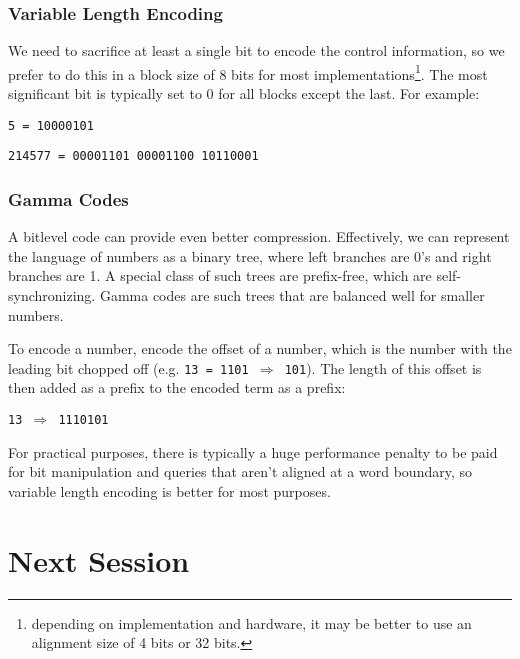 \documentclass{idc_msc}
\begin{document}
\subsubsection{Variable Length Encoding}

We need to sacrifice at least a single bit to encode the control information, so we prefer to do this in a block size of 8 bits for most implementations\footnote{depending on implementation and hardware, it may be better to use an alignment size of 4 bits or 32 bits.}.
The most significant bit is typically set to 0 for all blocks except the last.
For example:

\begin{center}
\texttt{5 = 10000101}

\texttt{214577 = 00001101 00001100 10110001}
\end{center}

\subsubsection{Gamma Codes}

A bitlevel code can provide even better compression.
Effectively, we can represent the language of numbers as a binary tree, where left branches are 0's and right branches are 1.
A special class of such trees are prefix-free, which are self-synchronizing.
Gamma codes are such trees that are balanced well for smaller numbers.

To encode a number, encode the offset of a number, which is the number with the leading bit chopped off (e.g. \texttt{13 = 1101 \(\Rightarrow\) 101}).
The length of this offset is then added as a prefix to the encoded term as a prefix:

\begin{center}
\texttt{13 \(\Rightarrow\) 1110101}
\end{center}

For practical purposes, there is typically a huge performance penalty to be paid for bit manipulation and queries that aren't aligned at a word boundary, so variable length encoding is better for most purposes.

\section{Next Session}
\end{document}
